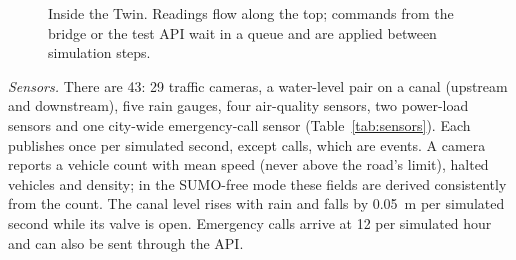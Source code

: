 \begin{figure}[t]
\centering
{}
\caption{Inside the Twin. Readings flow along the top; commands from the bridge or the test API wait in a queue and are applied between simulation steps.}
\label{fig:twin}
\end{figure}

\emph{Sensors.} There are 43: 29 traffic cameras, a water-level pair on a canal (upstream and downstream), five rain gauges, four air-quality sensors, two power-load
sensors and one city-wide emergency-call sensor (Table~\ref{tab:sensors}). Each publishes once per simulated second, except calls, which are events.
A camera reports a vehicle count with mean speed (never above the road's limit), halted vehicles and density; in the SUMO-free  mode these fields are derived consistently from the count.
The canal level rises with rain and falls by 0.05~m per simulated second while its valve is open. Emergency calls arrive at 12 per simulated hour and can also be sent through the API.

